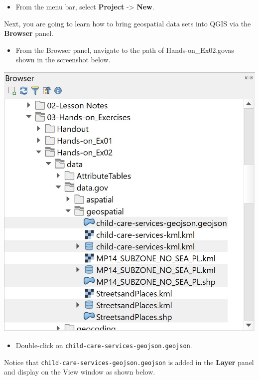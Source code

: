 \documentclass[
  letterpaper,
  DIV=11,
  numbers=noendperiod]{scrreprt}
\providecommand{\tightlist}{%
  \setlength{\itemsep}{0pt}\setlength{\parskip}{0pt}}\usepackage{longtable,booktabs,array}
\begin{document}
\begin{itemize}
\tightlist
\item
  From the menu bar, select \textbf{Project} -\textgreater{}
  \textbf{New}.
\end{itemize}

Next, you are going to learn how to bring geospatial data sets into QGIS
via the \textbf{Browser} panel.

\begin{itemize}
\tightlist
\item
  From the Browser panel, navigate to the path of
  Hands-on\_Ex02\data\data.gov\geospatial as shown in the screenshot
  below.
\end{itemize}

\includegraphics{./img02/image4.jpg}

\begin{itemize}
\tightlist
\item
  Double-click on \texttt{child-care-services-geojson.geojson}.
\end{itemize}

Notice that \texttt{child-care-services-geojson.geojson} is added in the
\textbf{Layer} panel and display on the View window as shown below.
\end{document}
